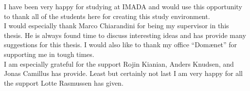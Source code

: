 I have been very happy for studying at IMADA and would use this opportunity to thank all of the students here for 
creating this study environment. \\ 
I would especially thank Marco Chiarandini for being my supervisor in this thesis. 
He is always found time to discuss interesting ideas and has provide many suggestions for this thesis. I would also 
like to thank my office ``Domænet'' for supporting me in tough times. \\ 
I am especially grateful for the support Rojin Kianian, Anders Knudsen, and Jonas Camillus has provide. Least but 
certainly not last I am very happy for all the support Lotte Rasmussen has given. 